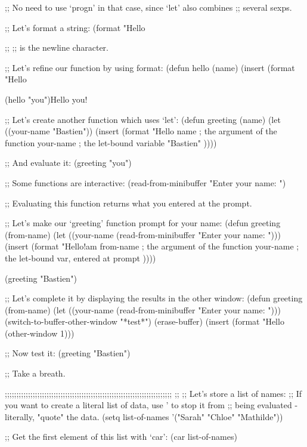 ;; No need to use `progn' in that case, since `let' also combines
;; several sexps.

;; Let's format a string:
(format "Hello %

;; %
;; \n is the newline character.

;; Let's refine our function by using format:
(defun hello (name)
  (insert (format "Hello %

(hello "you")Hello you!


;; Let's create another function which uses `let':
(defun greeting (name)
  (let ((your-name "Bastien"))
    (insert (format "Hello %
                    name       ; the argument of the function
                    your-name  ; the let-bound variable "Bastien"
                    ))))

;; And evaluate it:
(greeting "you")

;; Some functions are interactive:
(read-from-minibuffer "Enter your name: ")

;; Evaluating this function returns what you entered at the prompt.

;; Let's make our `greeting' function prompt for your name:
(defun greeting (from-name)
  (let ((your-name (read-from-minibuffer "Enter your name: ")))
    (insert (format "Hello!\n\nI am %
                    from-name ; the argument of the function
                    your-name ; the let-bound var, entered at prompt
                    ))))

(greeting "Bastien")

;; Let's complete it by displaying the results in the other window:
(defun greeting (from-name)
  (let ((your-name (read-from-minibuffer "Enter your name: ")))
    (switch-to-buffer-other-window "*test*")
    (erase-buffer)
    (insert (format "Hello %
    (other-window 1)))

;; Now test it:
(greeting "Bastien")

;; Take a breath.

;;;;;;;;;;;;;;;;;;;;;;;;;;;;;;;;;;;;;;;;;;;;;;;;;;;;;;;;;;;;;;;;;;;;;;;;
;;
;; Let's store a list of names:
;; If you want to create a literal list of data, use ' to stop it from
;; being evaluated - literally, "quote" the data.
(setq list-of-names '("Sarah" "Chloe" "Mathilde"))

;; Get the first element of this list with `car':
(car list-of-names)


